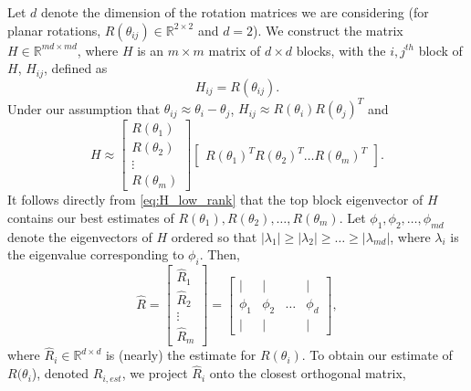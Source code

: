 \documentclass[10pt,twocolumn]{article}
\begin{document}
Let $d$ denote the dimension of the rotation matrices we are considering (for planar rotations, $R(\theta_{ij}) \in \mathbb{R}^{2 \times 2}$ and $d=2$).
%
We construct the matrix $H \in \mathbb{R}^{md \times md}$, where $H$ is an $m \times m$ matrix of $d \times d$ blocks, with the $i,j^{th}$ block of $H$, $H_{ij}$, defined as
\begin{equation} \label{eq:H_to_R}
H_{ij} = R(\theta_{ij}).
\end{equation}
%
%
Under our assumption that $\theta_{ij} \approx \theta_i - \theta_j$, $H_{ij} \approx R(\theta_i) R(\theta_j)^T$
 and
\begin{equation} \label{eq:H_low_rank}
	H \approx
	\begin{bmatrix}
	R(\theta_1) \\
	R(\theta_2) \\
	\vdots \\
	R(\theta_m)
	\end{bmatrix}
	\begin{bmatrix}
	R(\theta_1)^T R(\theta_2)^T \dots R(\theta_m)^T
	\end{bmatrix}.
\end{equation}
%
It follows directly from \eqref{eq:H_low_rank} that the top block eigenvector of $H$ contains our best estimates of $R(\theta_1), R(\theta_2), \dots, R(\theta_m)$.
%
Let $\phi_1, \phi_2, \dots, \phi_{md}$ denote the eigenvectors of $H$ ordered so that $|\lambda_1| \ge |\lambda_2| \ge \dots \ge |\lambda_{md}|$, where $\lambda_i$ is the eigenvalue corresponding to $\phi_i$.
%
Then,
\begin{equation} \label{eq:R_hat}
\hat{R} =
\begin{bmatrix}
\hat{R}_1 \\
\hat{R}_2 \\
\vdots \\
\hat{R}_m
\end{bmatrix} =
\begin{bmatrix}
| & | & & | \\
\phi_1 & \phi_2 & \dots & \phi_d \\
| & | & & |
\end{bmatrix},
\end{equation}
where $\hat{R}_i \in \mathbb{R}^{d \times d}$ is (nearly) the estimate for $R(\theta_i)$.
%
To obtain our estimate of $R(\theta_i$), denoted $R_{i, est}$, we project $\hat{R}_i$ onto the closest orthogonal matrix,
\end{document}
